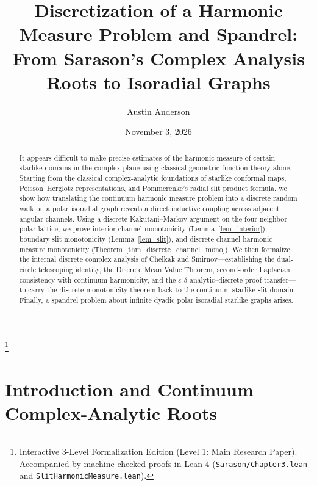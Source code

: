 \documentclass[11pt,reqno]{amsart}
\numberwithin{equation}{section}
\newcommand{\eps}{\varepsilon}
\begin{document}
\title[Discretization of a Harmonic Measure Problem and Spandrel]
{Discretization of a Harmonic Measure Problem and Spandrel:\\
From Sarason's Complex Analysis Roots to Isoradial Graphs}
\date{November 3, 2026}

\author[A. Anderson]{Austin Anderson}

\thanks{Interactive 3-Level Formalization Edition (Level 1: Main Research Paper). Accompanied by machine-checked proofs in Lean 4 (\texttt{Sarason/Chapter3.lean} and \texttt{SlitHarmonicMeasure.lean}).}

\begin{abstract}
It appears difficult to make precise estimates of the harmonic measure of certain starlike domains in the complex plane using classical geometric function theory alone. Starting from the classical complex-analytic foundations of starlike conformal maps, Poisson--Herglotz representations, and Pommerenke's radial slit product formula, we show how translating the continuum harmonic measure problem into a discrete random walk on a polar isoradial graph reveals a direct inductive coupling across adjacent angular channels. Using a discrete Kakutani--Markov argument on the four-neighbor polar lattice, we prove interior channel monotonicity (Lemma~\ref{lem_interior}), boundary slit monotonicity (Lemma~\ref{lem_slit}), and discrete channel harmonic measure monotonicity (Theorem~\ref{thm_discrete_channel_mono}). We then formalize the internal discrete complex analysis of Chelkak and Smirnov---establishing the dual-circle telescoping identity, the Discrete Mean Value Theorem, second-order Laplacian consistency with continuum harmonicity, and the $\eps$-$\delta$ analytic--discrete proof transfer---to carry the discrete monotonicity theorem back to the continuum starlike slit domain. Finally, a spandrel problem about infinite dyadic polar isoradial starlike graphs arises.
\end{abstract}

\maketitle

\section{Introduction and Continuum Complex-Analytic Roots}
\end{document}
